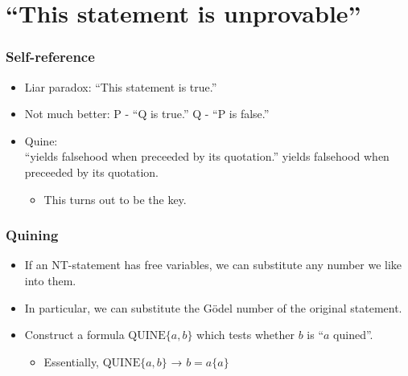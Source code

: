 \documentclass[mathserif]{beamer}
\begin{document}
\section{``This statement is unprovable''}
\label{sec-5}
\begin{frame}
\frametitle{Self-reference}
\label{sec-5-1}
\begin{itemize}

\item Liar paradox: ``This statement is true.''\\
\label{sec-5-1-1}%
\item Not much better: P - ``Q is true.'' Q - ``P is false.''\\
\label{sec-5-1-2}%
\item Quine:\\
\label{sec-5-1-3}%
``yields falsehood when preceeded by its quotation.'' yields falsehood when preceeded by its quotation.
\begin{itemize}

\item This turns out to be the key.\\
\label{sec-5-1-3-1}%
\end{itemize} %
\end{itemize} %
\end{frame}
\begin{frame}
\frametitle{Quining}
\label{sec-5-2}
\begin{itemize}

\item If an NT-statement has free variables, we can substitute any number we like into them.\\
\label{sec-5-2-1}%
\item In particular, we can substitute the Gödel number of the original statement.\\
\label{sec-5-2-2}%
\item Construct a formula $\text{QUINE}\{a,b\}$ which tests whether $b$ is ``$a$ quined''.
\label{sec-5-2-3}%
\begin{itemize}

\item Essentially, $\text{QUINE}\{a,b\}$ → $b = a\{a\}$\\
\label{sec-5-2-3-1}%
\end{itemize} %
\end{itemize} %
\end{frame}
\end{document}
